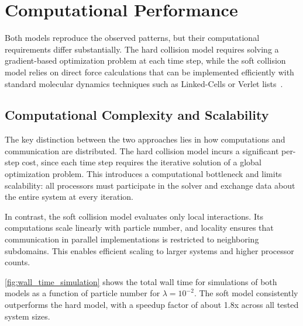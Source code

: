 \documentclass[conference]{IEEEtran}
\begin{document}
\newpage

\section{Computational Performance}

Both models reproduce the observed patterns, but their computational requirements differ substantially.
The hard collision model requires solving a gradient-based optimization problem at each time step,
while the soft collision model relies on direct force calculations that can be implemented efficiently
with standard molecular dynamics techniques such as Linked-Cells or Verlet lists~\cite{Gratl2019}.

\subsection{Computational Complexity and Scalability}
\label{sec:complexity_scalability}

The key distinction between the two approaches lies in how computations and communication are distributed.
The hard collision model incurs a significant per-step cost, since each time step requires the iterative
solution of a global optimization problem. This introduces a computational bottleneck and limits scalability:
all processors must participate in the solver and exchange data about the entire system at every iteration.

In contrast, the soft collision model evaluates only local interactions. Its computations scale linearly
with particle number, and locality ensures that communication in parallel implementations is restricted
to neighboring subdomains. This enables efficient scaling to larger systems and higher processor counts.

\autoref{fig:wall_time_simulation} shows the total wall time for simulations of both models
as a function of particle number for $\lambda = 10^{-2}$.
The soft model consistently outperforms the hard model, with a speedup factor of about 1.8x across all tested system sizes.






\end{document}

